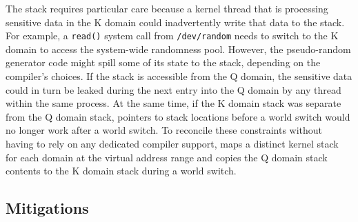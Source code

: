 The stack requires particular care because a kernel thread that is
processing sensitive data in the K domain could inadvertently write
that data to the stack.  For example, a \texttt{read()} system call
from \texttt{/dev/random} needs to switch to the K domain to access the
system-wide randomness pool.  However, the pseudo-random generator code
might spill some of its state to the stack, depending on the compiler's
choices.  If the stack is accessible from the Q domain, the sensitive
data could in turn be leaked during the next entry into the Q domain by any
thread within the same process.  At the same time, if the
K domain stack was separate from the Q domain stack, pointers to stack
locations before a world switch would no longer work after a world switch.
To reconcile these constraints without having to rely on any dedicated
compiler support, \sys maps a distinct kernel stack for each domain at the
virtual address range and copies the Q domain stack contents to the K domain
stack during a world switch.


\subsection{Mitigations}
\label{ss:mitigations}


